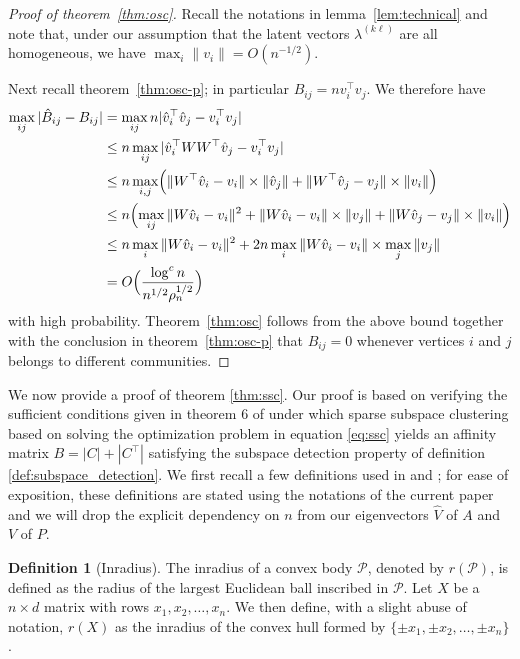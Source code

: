 \documentclass[
  11pt,
]{article}
\theoremstyle{definition}
\newtheorem{definition}{Definition}[section]
\theoremstyle{definition}
\theoremstyle{definition}
\theoremstyle{definition}
\theoremstyle{remark}
\begin{document}
\begin{proof}[Proof of theorem~\ref{thm:osc}]
Recall the notations in lemma~\ref{lem:technical} and note that,
under our assumption that the latent vectors $\lambda^{(k \ell)}$
are all homogeneous, we have $\max_{i} \|v_i\| =
O(n^{-1/2})$. 

Next recall theorem~\ref{thm:osc-p}; in particular $B_{ij} = nv_i^{\top}
v_j$. 
We therefore have
\[\begin{split}
 \max_{ij} |\hat{B}_{ij} - B_{ij}| &= \max_{ij} n |\hat{v}_i^\top \hat{v}_j -
v_i^\top v_j| \\
& \leq n \max_{ij} |\hat{v}_i^\top W W^\top \hat{v}_j -
v_i^\top v_j| \\
& \leq n \max_{i,j} \Bigl(\|W^{\top} \hat{v}_i - v_i\| \times \|\hat{v}_j\|
+ \|W^{\top} \hat{v}_j - v_j\| \times \|v_i\|\Bigr) \\
& \leq n \Bigl(\max_{ij}  \|W \hat{v}_i  - v_i \|^2 +  \|W
\hat{v}_i  - v_i \| \times \|v_j\| +  \|W \hat{v}_j  - v_j \| \times \|v_i\|\Bigr) 
\\ &
\leq n \max_{i} \|W \hat{v}_i  - v_i \|^2 + 2n \max_{i}
\|W \hat{v}_i  - v_i \| \times \max_{j} \|v_j\|
\\
& = O \Big( \frac{\log^{c}{n}}{n^{1/2} \rho_n^{1/2}} \Big)
\end{split}\]
with high probability.
Theorem~\ref{thm:osc} follows from the above bound together with the
conclusion in theorem~\ref{thm:osc-p} that $B_{ij} = 0$ whenever vertices $i$ and $j$
belongs to different communities. 
\end{proof}

We now provide a proof of theorem \ref{thm:ssc}. Our proof is based on verifying the sufficient conditions given in theorem 6 of \citet{jmlr-v28-wang13} under which sparse subspace clustering based on solving the optimization problem in equation \eqref{eq:ssc} yields an affinity matrix \(B = |C| + |C^{\top}|\) satisfying the subspace detection property of definition \ref{def:subspace_detection}.
We first recall a few definitions used in \citet{soltanolkotabi2012} and \citet{jmlr-v28-wang13};
for ease of exposition, these definitions are stated using the notations of the current paper and we will drop the explicit dependency on \(n\) from our eigenvectors \(\hat{V}\) of \(A\) and \(V\) of \(P\).

\begin{definition}[Inradius]
\label{def:inradius}
The inradius of a convex body $\mathcal{P}$, denoted by $r(\mathcal{P})$, is
defined as the radius of the largest Euclidean ball inscribed in $\mathcal{P}$.
Let $X$ be a $n \times d$ matrix with rows $x_1, x_2, \dots,
x_n$. We then define, with a slight abuse of notation, $r(X)$ as the
inradius of the convex hull formed by $\{\pm x_1, \pm x_2, \dots, \pm x_n\}$. 
\end{definition}
\end{document}
